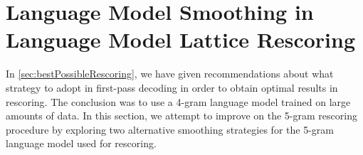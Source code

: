 
\section{Language Model Smoothing in Language Model Lattice Rescoring}
\label{sec:sbVSkn}


In \autoref{sec:bestPossibleRescoring}, we have given recommendations
about what strategy to adopt in first-pass decoding in order
to obtain optimal results in rescoring. The conclusion was to use
a 4-gram language model trained on large amounts of data.
In this section, we attempt to improve on the 5-gram rescoring
procedure by exploring two alternative smoothing strategies for the
5-gram language model used for rescoring.

